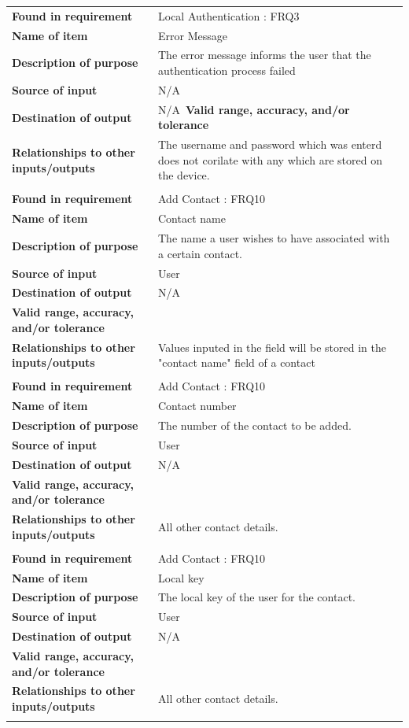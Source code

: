 \newpage
\begin{tabular}{ll}
\textbf{Found in requirement}&Local Authentication : FRQ3\\
\textbf{Name of item}&Error Message\\
\textbf{Description of purpose}&The error message informs the user that the authentication process failed\\
\textbf{Source of input}&N/A\\
\textbf{Destination of output}&N/A\
\textbf{Valid range, accuracy, and/or tolerance}&\\
\textbf{Relationships to other inputs/outputs}&The username and password which was enterd does not corilate with any which are stored on the device.\\
&\\
\textbf{Found in requirement}&Add Contact : FRQ10\\
\textbf{Name of item}&Contact name\\
\textbf{Description of purpose}&The name a user wishes to have associated with a certain contact.\\
\textbf{Source of input}&User\\
\textbf{Destination of output}&N/A\\
\textbf{Valid range, accuracy, and/or tolerance}&\\
\textbf{Relationships to other inputs/outputs}&Values inputed in the field will be stored in the "contact name" field of a contact\\
&\\
\textbf{Found in requirement}&Add Contact : FRQ10\\
\textbf{Name of item}&Contact number\\
\textbf{Description of purpose}&The number of the contact to be added.\\
\textbf{Source of input}&User\\
\textbf{Destination of output}&N/A\\
\textbf{Valid range, accuracy, and/or tolerance}&\\
\textbf{Relationships to other inputs/outputs}&All other contact details.\\
&\\
\textbf{Found in requirement}&Add Contact : FRQ10\\
\textbf{Name of item}&Local key\\
\textbf{Description of purpose}&The local key of the user for the contact.\\
\textbf{Source of input}&User\\
\textbf{Destination of output}&N/A\\
\textbf{Valid range, accuracy, and/or tolerance}&\\
\textbf{Relationships to other inputs/outputs}&All other contact details.\\
&\\
\end{tabular}
